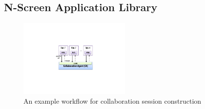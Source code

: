 \documentclass{sig-alternate}
\begin{document}
\subsection{N-Screen Application Library}

    \begin{figure}[htb] %
    \centering
    \includegraphics[width=5.5cm,keepaspectratio]{ca-api}
    \caption{An example workflow for collaboration session construction}
    \label{fig:ca-api}
    \end{figure}
\end{document}
